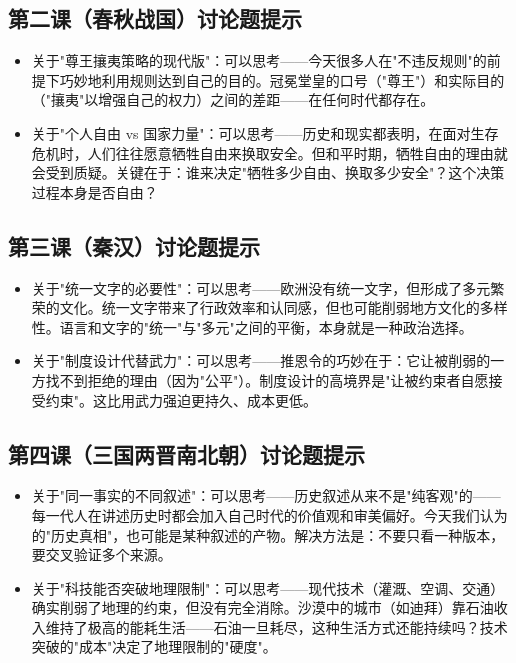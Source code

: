 \documentclass[a4paper,12pt]{ctexart}
\begin{document}
\subsection*{第二课（春秋战国）讨论题提示}
\begin{itemize}
  \item 关于"尊王攘夷策略的现代版"：可以思考——今天很多人在"不违反规则"的前提下巧妙地利用规则达到自己的目的。冠冕堂皇的口号（"尊王"）和实际目的（"攘夷"以增强自己的权力）之间的差距——在任何时代都存在。
  \item 关于"个人自由 vs 国家力量"：可以思考——历史和现实都表明，在面对生存危机时，人们往往愿意牺牲自由来换取安全。但和平时期，牺牲自由的理由就会受到质疑。关键在于：谁来决定"牺牲多少自由、换取多少安全"？这个决策过程本身是否自由？
\end{itemize}

\subsection*{第三课（秦汉）讨论题提示}
\begin{itemize}
  \item 关于"统一文字的必要性"：可以思考——欧洲没有统一文字，但形成了多元繁荣的文化。统一文字带来了行政效率和认同感，但也可能削弱地方文化的多样性。语言和文字的"统一"与"多元"之间的平衡，本身就是一种政治选择。
  \item 关于"制度设计代替武力"：可以思考——推恩令的巧妙在于：它让被削弱的一方找不到拒绝的理由（因为"公平"）。制度设计的高境界是"让被约束者自愿接受约束"。这比用武力强迫更持久、成本更低。
\end{itemize}

\subsection*{第四课（三国两晋南北朝）讨论题提示}
\begin{itemize}
  \item 关于"同一事实的不同叙述"：可以思考——历史叙述从来不是"纯客观"的——每一代人在讲述历史时都会加入自己时代的价值观和审美偏好。今天我们认为的"历史真相"，也可能是某种叙述的产物。解决方法是：不要只看一种版本，要交叉验证多个来源。
  \item 关于"科技能否突破地理限制"：可以思考——现代技术（灌溉、空调、交通）确实削弱了地理的约束，但没有完全消除。沙漠中的城市（如迪拜）靠石油收入维持了极高的能耗生活——石油一旦耗尽，这种生活方式还能持续吗？技术突破的"成本"决定了地理限制的"硬度"。
\end{itemize}
\end{document}
